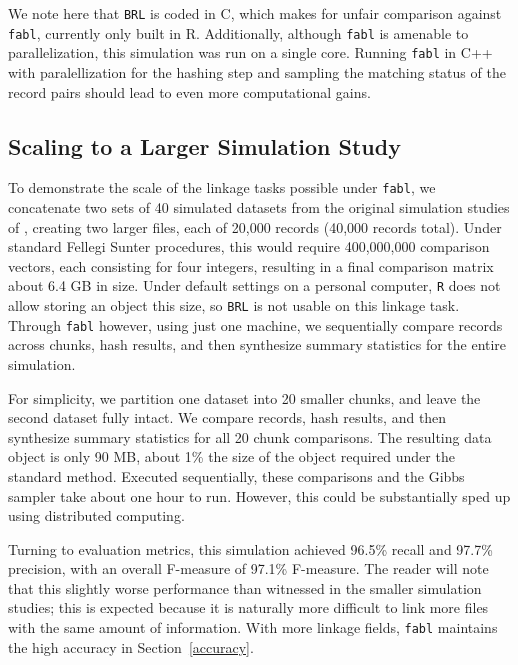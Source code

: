 \documentclass[12pt,letterpaper]{article}
\newcommand{\1}[1]{\mathbb{I}\!\left[#1\right]} %
\begin{document}
We note here that \texttt{BRL} is coded in C, which makes for unfair
comparison against \texttt{fabl}, currently only built in R.
Additionally, although \texttt{fabl} is amenable to parallelization,
this simulation was run on a single core. Running \texttt{fabl} in C++
with paralellization for the hashing step and sampling the matching
status of the record pairs should lead to even more computational gains.

\hypertarget{scale}{%
	\subsection{Scaling to a Larger Simulation Study}\label{scale}}

To demonstrate the scale of the linkage tasks possible under \texttt{fabl}, we concatenate two sets of 40 simulated datasets from the original simulation studies of \cite{sadinle_bayesian_2017}, creating two larger files, each of 20,000 records (40,000 records total). Under standard Fellegi Sunter procedures, this would require 400,000,000 comparison vectors, each consisting for four integers, resulting in a final comparison matrix about 6.4 GB in size. Under default settings on a personal computer, \texttt{R} does not allow storing an object this size, so \texttt{BRL} is not usable on this linkage task. Through \texttt{fabl} however, using just one machine, we sequentially compare records across chunks, hash results, and then synthesize summary statistics for the entire simulation.  
 
For simplicity, we partition one dataset into 20 smaller chunks, and leave the second dataset fully intact. We compare records, hash results, and then synthesize summary statistics for all 20 chunk comparisons. The resulting data object is only 90 MB, about 1\% the size of the object required under the standard method. Executed sequentially, these comparisons and the Gibbs sampler take about one hour to run. However, this could be substantially sped up using distributed computing.

Turning to evaluation metrics, this simulation achieved 96.5\% recall and 97.7\% precision, with an overall F-measure of 97.1\% F-measure. The reader will note that this slightly worse performance than witnessed in the smaller simulation studies; this is expected because it is naturally more difficult to link more files with the same amount of information. With more linkage fields, \texttt{fabl} maintains the high accuracy in Section~\ref{accuracy}. 
\end{document}
